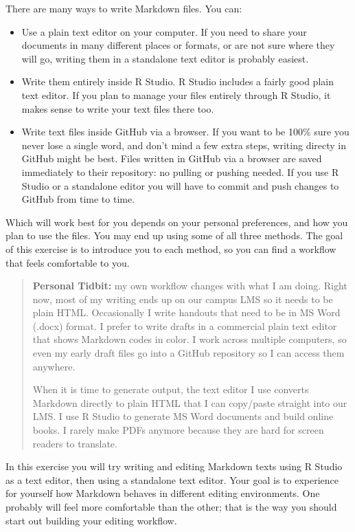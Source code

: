 \documentclass[
]{article}
\providecommand{\tightlist}{%
  \setlength{\itemsep}{0pt}\setlength{\parskip}{0pt}}
\begin{document}
There are many ways to write Markdown files. You can:

\begin{itemize}
\tightlist
\item
  Use a plain text editor on your computer. If you need to share your
  documents in many different places or formats, or are not sure where
  they will go, writing them in a standalone text editor is probably
  easiest.
\item
  Write them entirely inside R Studio. R Studio includes a fairly good
  plain text editor. If you plan to manage your files entirely through R
  Studio, it makes sense to write your text files there too.
\item
  Write text files inside GitHub via a browser. If you want to be 100\%
  sure you never lose a single word, and don't mind a few extra steps,
  writing directy in GitHub might be best. Files written in GitHub via a
  browser are saved immediately to their repository: no pulling or
  pushing needed. If you use R Studio or a standalone editor you will
  have to commit and push changes to GitHub from time to time.
\end{itemize}

Which will work best for you depends on your personal preferences, and
how you plan to use the files. You may end up using some of all three
methods. The goal of this exercise is to introduce you to each method,
so you can find a workflow that feels comfortable to you.

\begin{quote}
\textbf{Personal Tidbit:} my own workflow changes with what I am doing.
Right now, most of my writing ends up on our campus LMS so it needs to
be plain HTML. Occasionally I write handouts that need to be in MS Word
(.docx) format. I prefer to write drafts in a commercial plain text
editor that shows Markdown codes in color. I work across multiple
computers, so even my early draft files go into a GitHub repository so I
can access them anywhere.

When it is time to generate output, the text editor I use converts
Markdown directly to plain HTML that I can copy/paste straight into our
LMS. I use R Studio to generate MS Word documents and build online
books. I rarely make PDFs anymore because they are hard for screen
readers to translate.
\end{quote}

In this exercise you will try writing and editing Markdown texts using R
Studio as a text editor, then using a standalone text editor. Your goal
is to experience for yourself how Markdown behaves in different editing
environments. One probably will feel more comfortable than the other;
that is the way you should start out building your editing workflow.
\end{document}
